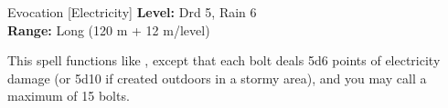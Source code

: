 {Evocation [Electricity]}
{
	\textbf{Level:}
	Drd 5, Rain 6\\
	\textbf{Range:}
	Long (120 m + 12 m/level)\\
}
{
	This spell functions like , except that each bolt deals 5d6 points of electricity damage (or 5d10 if created outdoors in a stormy area), and you may call a maximum of 15 bolts.

}
